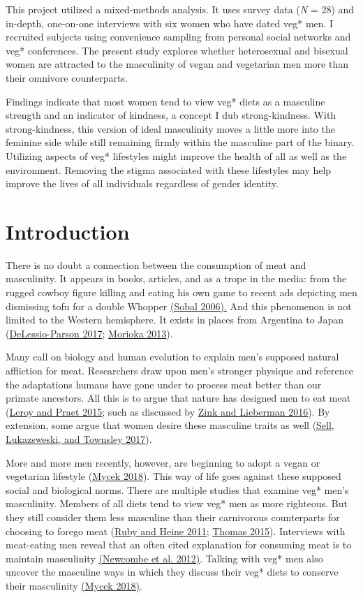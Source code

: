 \documentclass[twoside]{report}
\let\oldsection\section
\renewcommand\section{\clearpage\oldsection}
\begin{document}
This project utilized a mixed-methods analysis. It uses survey data (\emph{N} = 28) and in-depth, one-on-one interviews with six women who have dated veg* men. I recruited subjects using convenience sampling from personal social networks and veg* conferences. The present study explores whether heterosexual and bisexual women are attracted to the masculinity of vegan and vegetarian men more than their omnivore counterparts.

Findings indicate that most women tend to view veg* diets as a masculine strength and an indicator of kindness, a concept I dub strong-kindness. With strong-kindness, this version of ideal masculinity moves a little more into the feminine side while still remaining firmly within the masculine part of the binary. Utilizing aspects of veg* lifestyles might improve the health of all as well as the environment. Removing the stigma associated with these lifestyles may help improve the lives of
all individuals regardless of gender identity.

\raggedbottom
\pagebreak

\section{Introduction}

There is no doubt a connection between the consumption of meat and masculinity. It appears in books, articles, and as a trope in the media: from the rugged cowboy figure killing and eating his own game to recent ads depicting men dismissing tofu for a double Whopper \hyperlink{sobal}{(Sobal 2006).} And this phenomenon is not limited to the Western hemisphere. It exists in places from Argentina to Japan (\hyperlink{delessio-parson}{DeLessio-Parson 2017}; \hyperlink{morioka}{Morioka 2013}).

Many call on biology and human evolution to explain men's supposed natural affliction for meat. Researchers draw upon men's stronger physique and reference the adaptations humans have gone under to process meat better than our primate ancestors. All this is to argue that nature has designed men to eat meat (\hyperlink{leroy}{Leroy and Praet 2015}; such as discussed by \hyperlink{zink}{Zink and Lieberman 2016}). By extension, some argue that women desire these masculine traits as well (\hyperlink{sell}{Sell, Lukazsweski, and Townsley 2017}).

More and more men recently, however, are beginning to adopt a vegan or vegetarian lifestyle (\hyperlink{mycek}{Mycek 2018}). This way of life goes against these supposed social and biological norms. There are multiple studies that examine veg* men's masculinity. Members of all diets tend to view veg* men as more righteous. But they still consider them less masculine than their carnivorous counterparts for choosing to forego meat (\hyperlink{ruby}{Ruby and Heine 2011}; \hyperlink{thomas}{Thomas 2015}). Interviews with meat-eating men reveal that an often cited explanation for consuming meat is to maintain masculinity \hyperlink{newcombe}{(Newcombe et al. 2012)}. Talking with veg* men also uncover the masculine ways in which they discuss their veg* diets to conserve their masculinity \hyperlink{mycek}{(Mycek 2018)}.
\end{document}
